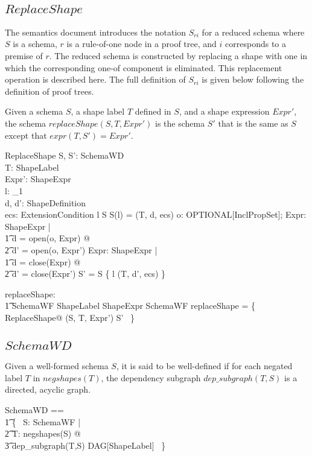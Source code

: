\documentclass{article}
\begin{document}
\subsection{$ReplaceShape$}
The semantics document introduces the notation $S_{ri}$ for a reduced schema where $S$ is a schema, 
$r$ is a rule-of-one node in a proof tree, and $i$ corresponds to a premise of $r$.
The reduced schema is constructed by replacing a shape with one in which the corresponding one-of component is eliminated.
This replacement operation is described here.
The full definition of $S_{ri}$ is given below following the definition of proof trees.

Given a schema $S$, a shape label $T$ defined in $S$, and a shape expression $Expr'$, the schema $replaceShape(S,T,Expr')$
is the schema $S'$ that is the same as $S$ except that $expr(T,S') = Expr'$.
\begin{schema}{ReplaceShape}
	S, S': SchemaWD \\
	T: ShapeLabel \\
	Expr': ShapeExpr \\
	l: \nat_1\\
	d, d': ShapeDefinition \\
	ecs: \seq ExtensionCondition
\where
	l \in \dom S
\also
	S(l) = (T, d, ecs)
\also
	\forall o: OPTIONAL[InclPropSet]; Expr: ShapeExpr | \\
\t1		d = open(o, Expr) @ \\
\t2			d' = open(o, Expr')
\also
	\forall Expr: ShapeExpr | \\
\t1		d = close(Expr) @ \\
\t2			d' = close(Expr')
\also
	S' = S \oplus \{ l \mapsto (T, d', ecs) \}
\end{schema}

\begin{axdef}
	replaceShape: \\
\t1		SchemaWF \cross ShapeLabel \cross ShapeExpr \pfun SchemaWF
\where
	replaceShape = \{~ ReplaceShape@ (S, T, Expr') \mapsto S' ~\}
\end{axdef}

\subsection{$SchemaWD$}
Given a well-formed schema $S$, it is said to be well-defined if for each negated label $T$ in $negshapes(T)$, the dependency subgraph
$dep\_subgraph(T,S)$ is a directed, acyclic graph.
\begin{zed}
	SchemaWD == \\
\t1		\{~ S: SchemaWF | \\
\t2			\forall T: negshapes(S) @ \\
\t3				dep\_subgraph(T,S) \in DAG[ShapeLabel] ~\}
\end{zed}
\end{document}
